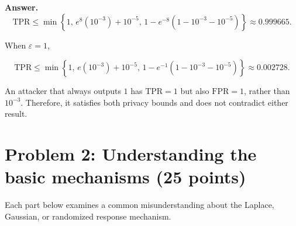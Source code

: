 \documentclass[11pt]{article}
\newcommand{\FPR}{\mathrm{FPR}}
\newcommand{\TPR}{\mathrm{TPR}}
\newcommand{\eps}{\varepsilon}
\newenvironment{answer}{\par\medskip\noindent\textbf{Answer.}\ }{\par\bigskip}
\newcommand{\problem}[2]{\section*{#1 \hfill\normalsize(#2)}}
\begin{document}
\begin{enumerate}
\begin{answer}
\[
\TPR \le
\min\left\{
1,\,
e^8(10^{-3})+10^{-5},\,
1-e^{-8}(1-10^{-3}-10^{-5})
\right\}
\approx 0.999665.
\]

When $\eps=1$,

\[
\TPR \le
\min\left\{
1,\,
e(10^{-3})+10^{-5},\,
1-e^{-1}(1-10^{-3}-10^{-5})
\right\}
\approx 0.002728.
\]

An attacker that always outputs $1$ has
$\TPR=1$ but also $\FPR=1$, rather than
$10^{-3}$. Therefore, it satisfies both
privacy bounds and does not contradict
either result.

\end{answer}

\end{enumerate}

\problem{Problem 2: Understanding the basic mechanisms}{25 points}

Each part below examines a common misunderstanding about the Laplace,
Gaussian, or randomized response mechanism.
\end{document}
